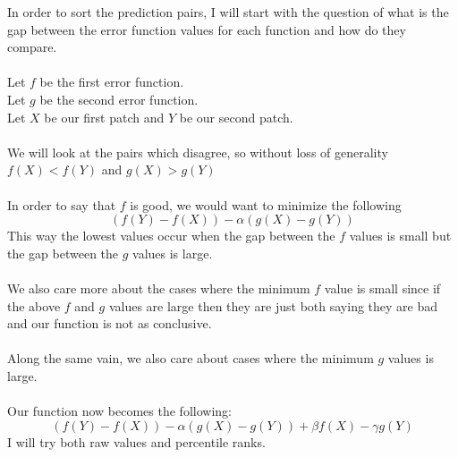 \documentclass[11pt,psfig]{article}
\begin{document}
\setlength{\parskip}{1.2ex plus0.3ex minus 0.3ex}


\thispagestyle{empty} \pagestyle{myheadings} 



In order to sort the prediction pairs, I will start with the question of what is the gap between the error function values for each function and how do they compare. \\
\\
Let $f$ be the first error function.\\
Let $g$ be the second error function.\\
Let $X$ be our first patch and $Y$ be our second patch.\\
\\
We will look at the pairs which disagree, so without loss of generality\\
$f(X) < f(Y)$ and $g(X) > g(Y)$ \\
\\
In order to say that $f$ is good, we would want to minimize the following
\[
(f(Y)-f(X)) - \alpha(g(X)-g(Y))
\]
This way the lowest values occur when the gap between the $f$ values is small but the gap between the $g$ values is large.\\
\\
We also care more about the cases where the minimum $f$ value is small since if the above $f$ and $g$ values are large then they are just both saying they are bad and our function is not as conclusive. \\
\\
Along the same vain, we also care about cases where the minimum $g$ values is large.\\
\\
Our function now becomes the following:
\[
(f(Y)-f(X)) - \alpha(g(X)-g(Y)) + \beta f(X) - \gamma g(Y)
\]
I will try both raw values and percentile ranks.
\end{document}
